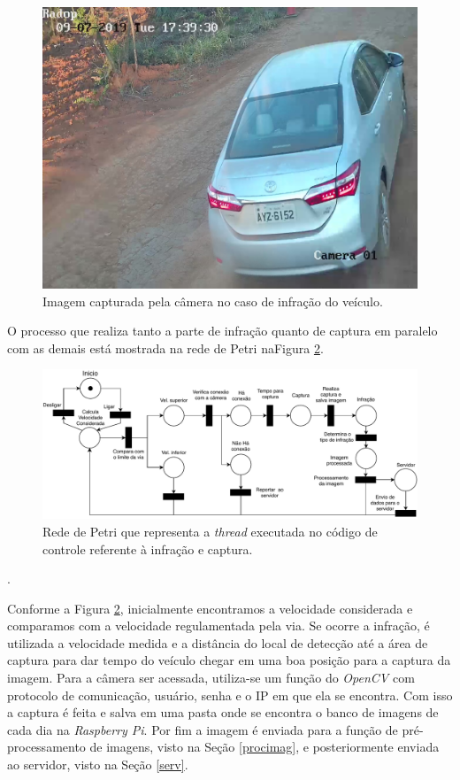 \begin{figure}[H]
    \centering
    \includegraphics[scale=0.18]{figuras/17_39_34_790981.jpg}
    \caption{Imagem capturada pela câmera no caso de infração do veículo.}
    \label{carro1}
\end{figure}

O processo que realiza tanto a parte de infração quanto de captura em paralelo com as demais está mostrada na rede de Petri na{Figura \ref{Petricaptura}}.

\begin{figure}[H]
    \centering
    \includegraphics[scale = 0.54]{figuras/PetriNet_Infracao-3.pdf}
    \caption{Rede de Petri que representa a \emph{thread} executada no código de controle referente à infração e captura.}
    \label{Petricaptura}
    \end{figure}. 

Conforme a {Figura \ref{Petricaptura}}, inicialmente encontramos a velocidade considerada e comparamos com a velocidade regulamentada pela via. Se ocorre a infração, é utilizada a velocidade medida e a distância do local de detecção até a área de captura para dar tempo do veículo chegar em uma boa posição para a captura da imagem. Para a câmera ser acessada, utiliza-se um função do \emph{OpenCV} com protocolo de comunicação, usuário, senha e o IP em que ela se encontra. Com isso a captura é feita e salva em uma pasta onde se encontra o banco de imagens de cada dia na \emph{Raspberry Pi}. Por fim a imagem é enviada para a função de pré-processamento de imagens, visto na Seção \ref{procimag}, e posteriormente enviada ao servidor, visto na Seção \ref{serv}.

